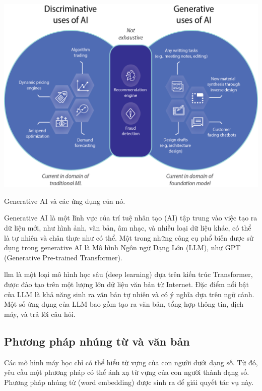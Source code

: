 \documentclass[a4paper, 12pt, openany]{book}
\begin{document}
\vspace{0.5cm}
\begin{minipage}{\linewidth}
    \captionsetup{type=figure}
    \centering
    \includegraphics[width=\linewidth]{./assets/images/generative-ai-benefits.png}
    \caption{Generative AI và các ứng dụng của nó.}
\end{minipage}
\vspace{0.5cm}

Generative AI là một lĩnh vực của trí tuệ nhân tạo (AI) tập trung vào việc tạo ra dữ liệu mới, như hình ảnh, văn bản, âm nhạc, và nhiều loại dữ liệu khác, có thể là tự nhiên và chân thực như có thể. Một trong những công cụ phổ biến được sử dụng trong generative AI là Mô hình Ngôn ngữ Dạng Lớn (LLM), như GPT (Generative Pre-trained Transformer).

\acl{llm} là một loại mô hình học sâu (deep learning) dựa trên kiến trúc Transformer, được đào tạo trên một lượng lớn dữ liệu văn bản từ Internet. Đặc điểm nổi bật của LLM là khả năng sinh ra văn bản tự nhiên và có ý nghĩa dựa trên ngữ cảnh. Một số ứng dụng của LLM bao gồm tạo ra văn bản, tổng hợp thông tin, dịch máy, và trả lời câu hỏi.

\subsection{Phương pháp nhúng từ và văn bản}

Các mô hình máy học chỉ có thể hiểu từ vựng của con người dưới dạng số. Từ đó, yêu cầu một phương pháp có thể
ánh xạ từ vựng của con người thành dạng số. Phương pháp nhúng từ (word embedding)
được sinh ra để giải quyết tác vụ này.
\end{document}
